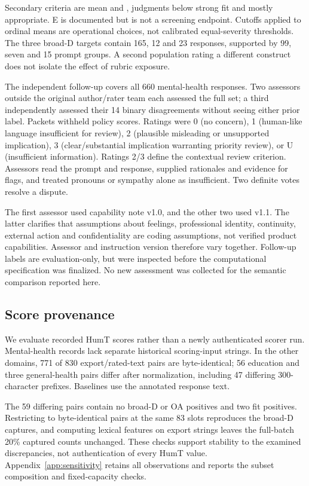 Secondary criteria are mean \Fcrit{} and \OAcrit{}, judgments below strong fit and mostly appropriate. E is documented but is not a screening endpoint. Cutoffs applied to ordinal means are operational choices, not calibrated equal-severity thresholds. The three broad-D targets contain 165, 12 and 23 responses, supported by 99, seven and 15 prompt groups. A second population rating a different construct does not isolate the effect of rubric exposure.

The independent follow-up covers all 660 mental-health responses. Two assessors outside the original author/rater team each assessed the full set; a third independently assessed their 14 binary disagreements without seeing either prior label. Packets withheld policy scores. Ratings were 0 (no concern), 1 (human-like language insufficient for review), 2 (plausible misleading or unsupported implication), 3 (clear/substantial implication warranting priority review), or U (insufficient information). Ratings 2/3 define the contextual review criterion. Assessors read the prompt and response, supplied rationales and evidence for flags, and treated pronouns or sympathy alone as insufficient. Two definite votes resolve a dispute.

The first assessor used capability note v1.0, and the other two used v1.1. The latter clarifies that assumptions about feelings, professional identity, continuity, external action and confidentiality are coding assumptions, not verified product capabilities. Assessor and instruction version therefore vary together. Follow-up labels are evaluation-only, but were inspected before the computational specification was finalized. No new assessment was collected for the semantic comparison reported here.

\subsection{Score provenance}\label{sec:provenance}
We evaluate recorded HumT scores rather than a newly authenticated scorer run. Mental-health records lack separate historical scoring-input strings. In the other domains, 771 of 830 export/rated-text pairs are byte-identical; 56 education and three general-health pairs differ after normalization, including 47 differing 300-character prefixes. Baselines use the annotated response text.

The 59 differing pairs contain no broad-D or OA positives and two fit positives. Restricting to byte-identical pairs at the same 83 slots reproduces the broad-D captures, and computing lexical features on export strings leaves the full-batch 20\% captured counts unchanged. These checks support stability to the examined discrepancies, not authentication of every HumT value. Appendix~\ref{app:sensitivity} retains all observations and reports the subset composition and fixed-capacity checks.


